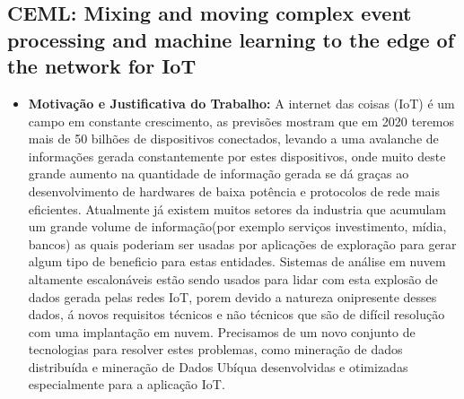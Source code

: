 \documentclass[tid,table]{texufpel} %
\begin{document}
\subsection{CEML: Mixing and moving complex event processing and machine learning to the edge of the network for IoT}

\begin{itemize}
	\item \textbf{Motivação e Justificativa do Trabalho:} A internet das coisas (IoT) é um campo em constante crescimento, as previsões mostram que em 2020 teremos mais de 50 bilhões de dispositivos conectados, levando a uma avalanche de informações gerada constantemente por estes dispositivos, onde muito deste grande aumento na quantidade de informação gerada se dá graças ao desenvolvimento de hardwares de baixa potência e protocolos de rede mais eficientes. Atualmente já existem muitos setores da industria que acumulam um grande volume de informação(por exemplo serviços investimento, mídia, bancos) as quais poderiam ser usadas por aplicações de exploração para gerar algum tipo de beneficio para estas entidades. Sistemas de análise em nuvem altamente escalonáveis estão sendo usados para lidar com esta explosão de dados gerada pelas redes IoT, porem devido a natureza onipresente desses dados, á novos requisitos técnicos e não técnicos que são de difícil resolução com uma implantação em nuvem. Precisamos de um novo conjunto de tecnologias para resolver estes problemas, como mineração de dados distribuída e mineração de Dados Ubíqua desenvolvidas e otimizadas especialmente para a aplicação IoT.
	

\end{itemize}
\end{document}
